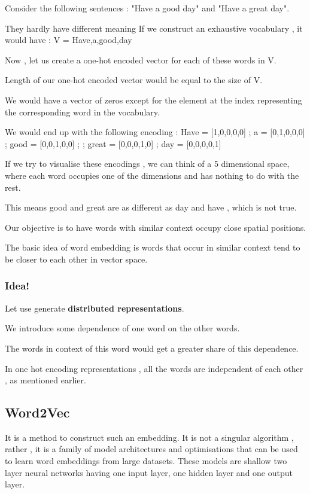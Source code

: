 \documentclass{article}
\begin{document}
Consider the following sentences : "Have a good day" and "Have a great day".

They hardly have different meaning
If we construct an exhaustive vocabulary , it would have : V = {Have,a,good,day}

Now , let us create a one-hot encoded vector for each of these words in V.

Length of our one-hot encoded vector would be equal to the size of V.

We would have a vector of zeros except for the element at the index representing the corresponding word in the vocabulary.

We would end up with the following encoding : Have = [1,0,0,0,0] ; a = [0,1,0,0,0] ; good = [0,0,1,0,0] ; ; great = [0,0,0,1,0] ; day = [0,0,0,0,1]

If we try to visualise these encodings , we can think of a 5 dimensional space, where each word occupies one of the dimensions and has nothing to do with the rest.

This means good and great are as different as day and have , which is not true.

Our objective is to have words with similar context occupy close spatial positions.

The basic idea of word embedding is words that occur in similar context tend to be closer to each other in vector space.

\subsubsection{Idea!}

Let use generate \textbf{distributed representations}.

We introduce some dependence of one word on the other words.

The words in context of this word would get a greater share of this dependence.

In one hot encoding representations , all the words are independent of each other , as mentioned earlier.

\subsection{Word2Vec}
It is a method to construct such an embedding.
It is not a singular algorithm , rather , it is a family of model architectures and optimisations that can be used to learn word embeddings from large datasets.
These models are shallow two layer neural networks having one input layer, one hidden layer and one output layer.
\end{document}
